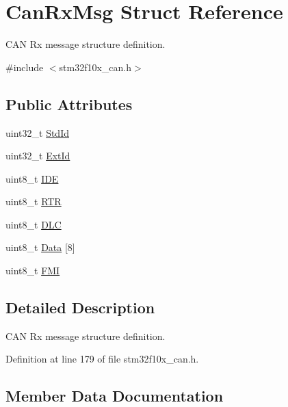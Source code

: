 \hypertarget{struct_can_rx_msg}{}\section{Can\+Rx\+Msg Struct Reference}
\label{struct_can_rx_msg}


C\+AN Rx message structure definition.  




{\ttfamily \#include $<$stm32f10x\+\_\+can.\+h$>$}

\subsection*{Public Attributes}
\begin{DoxyCompactItemize}
\item 
uint32\+\_\+t \hyperlink{struct_can_rx_msg_a62769e18836146f71238bee6b43b531e}{Std\+Id}
\item 
uint32\+\_\+t \hyperlink{struct_can_rx_msg_a1fdca10d31c81eea2ccef41d2aced562}{Ext\+Id}
\item 
uint8\+\_\+t \hyperlink{struct_can_rx_msg_a83a67d1a709cc01570ce956e5adc811f}{I\+DE}
\item 
uint8\+\_\+t \hyperlink{struct_can_rx_msg_a9a183149a391a24f86da2ce895f0f1c9}{R\+TR}
\item 
uint8\+\_\+t \hyperlink{struct_can_rx_msg_abf77d3abf9ad290c08cdfd5d99ebc745}{D\+LC}
\item 
uint8\+\_\+t \hyperlink{struct_can_rx_msg_ae8ecbad16622db30d63fda08bc478649}{Data} \mbox{[}8\mbox{]}
\item 
uint8\+\_\+t \hyperlink{struct_can_rx_msg_a5afe39d8e295659eeb3030593828b96a}{F\+MI}
\end{DoxyCompactItemize}


\subsection{Detailed Description}
C\+AN Rx message structure definition. 

Definition at line 179 of file stm32f10x\+\_\+can.\+h.



\subsection{Member Data Documentation}
\mbox{\label{struct_can_rx_msg_ae8ecbad16622db30d63fda08bc478649}} 
